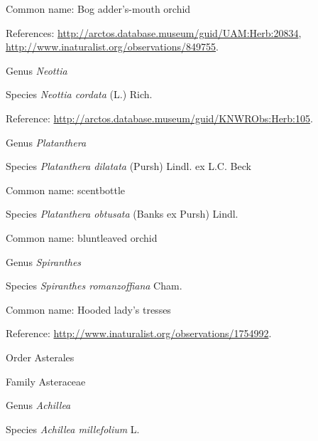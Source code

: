 \documentclass[9pt, article]{memoir}
\begin{document}
\begin{multicols}{2}
Common name: Bog adder's-mouth orchid

References: 
\url{http://arctos.database.museum/guid/UAM:Herb:20834}, 
\url{http://www.inaturalist.org/observations/849755}.

\vspace{6pt}\noindent\hspace{30pt}Genus \textit{Neottia}


\vspace{6pt}\noindent\hspace{36pt}Species \textit{Neottia cordata} (L.) Rich.


Reference: 
\url{http://arctos.database.museum/guid/KNWRObs:Herb:105}.

\vspace{6pt}\noindent\hspace{30pt}Genus \textit{Platanthera}


\vspace{6pt}\noindent\hspace{36pt}Species \textit{Platanthera dilatata} (Pursh) Lindl. ex L.C. Beck


Common name: scentbottle

\vspace{6pt}\noindent\hspace{36pt}Species \textit{Platanthera obtusata} (Banks ex Pursh) Lindl.


Common name: bluntleaved orchid

\vspace{6pt}\noindent\hspace{30pt}Genus \textit{Spiranthes}


\vspace{6pt}\noindent\hspace{36pt}Species \textit{Spiranthes romanzoffiana} Cham.


Common name: Hooded lady's tresses

Reference: 
\url{http://www.inaturalist.org/observations/1754992}.

\vspace{6pt}\noindent\hspace{18pt}Order Asterales


\vspace{6pt}\noindent\hspace{24pt}Family Asteraceae


\vspace{6pt}\noindent\hspace{30pt}Genus \textit{Achillea}


\vspace{6pt}\noindent\hspace{36pt}Species \textit{Achillea millefolium} L.



\end{multicols}
\end{document}
